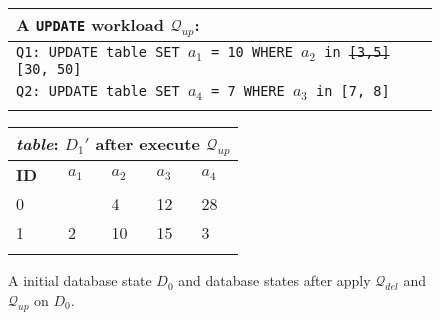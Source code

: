 \begin{figure*}[ht]
{\begin{minipage}[t]{0.2\textwidth}
\begin{tabular}{lllll}
            
    \end{tabular}
    \end{minipage}
 \begin{minipage}[t]{0.5\textwidth}
         \vspace{0pt} 
         \centering
        \begin{tabular}{l}
   			\multicolumn{1}{l}{A \texttt{UPDATE} workload $\mathcal{Q}_{up}$:                              }\\
   			 \toprule
            \texttt{Q1: UPDATE table SET $a_1$ = 10 WHERE $a_2$ in \sout{[3,5]} {\color{red}[30, 50]}} \\
   			\texttt{Q2: UPDATE table SET $a_4$ = 7 WHERE $a_3$ in [7, 8] }\\ \hline
            \\
    \end{tabular}
    \end{minipage}     
    \begin{minipage}[t]{0.2\textwidth}
         \vspace{0pt} 
         \centering
\begin{tabular}{lllll}
            \multicolumn{5}{l}{\emph{table}: $D_1'$ after execute $\mathcal{Q}_{up}$}\\
            \toprule
            \textbf{ID}  & \textbf{$a_1$}    & \textbf{$a_2$} & \textbf{$a_3$} & \textbf{$a_4$} \\
            \midrule
            \rowcolor{mid-gray}
            0 & \color{red}{8} & 4 & 12 & 28\\
            1 & 2 & 10 & 15 & 3\\
            \bottomrule
            \\
\end{tabular}
    \end{minipage}
}
    \vspace{-2mm}
    \caption{A initial database state $D_0$ and database states after apply $\mathcal{Q}_{del}$ and $\mathcal{Q}_{up}$ on $D_0$. }
    \label{fig:example2}
\end{figure*}